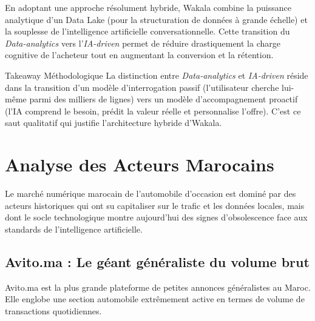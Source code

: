 \documentclass[11pt,a4paper]{article}
\begin{document}
En adoptant une approche résolument hybride, Wakala combine la puissance analytique d'un Data Lake (pour la structuration de données à grande échelle) et la souplesse de l'intelligence artificielle conversationnelle. Cette transition du \textit{Data-analytics} vers l'\textit{IA-driven} permet de réduire drastiquement la charge cognitive de l'acheteur tout en augmentant la conversion et la rétention.

\begin{insightbox}{Takeaway Méthodologique}
La distinction entre \textit{Data-analytics} et \textit{IA-driven} réside dans la transition d'un modèle d'interrogation passif (l'utilisateur cherche lui-même parmi des milliers de lignes) vers un modèle d'accompagnement proactif (l'IA comprend le besoin, prédit la valeur réelle et personnalise l'offre). C'est ce saut qualitatif qui justifie l'architecture hybride d'Wakala.
\end{insightbox}

\newpage

\section{Analyse des Acteurs Marocains}

Le marché numérique marocain de l'automobile d'occasion est dominé par des acteurs historiques qui ont su capitaliser sur le trafic et les données locales, mais dont le socle technologique montre aujourd'hui des signes d'obsolescence face aux standards de l'intelligence artificielle.

\subsection{Avito.ma : Le géant généraliste du volume brut}
Avito.ma est la plus grande plateforme de petites annonces généralistes au Maroc. Elle englobe une section automobile extrêmement active en termes de volume de transactions quotidiennes.
\end{document}
